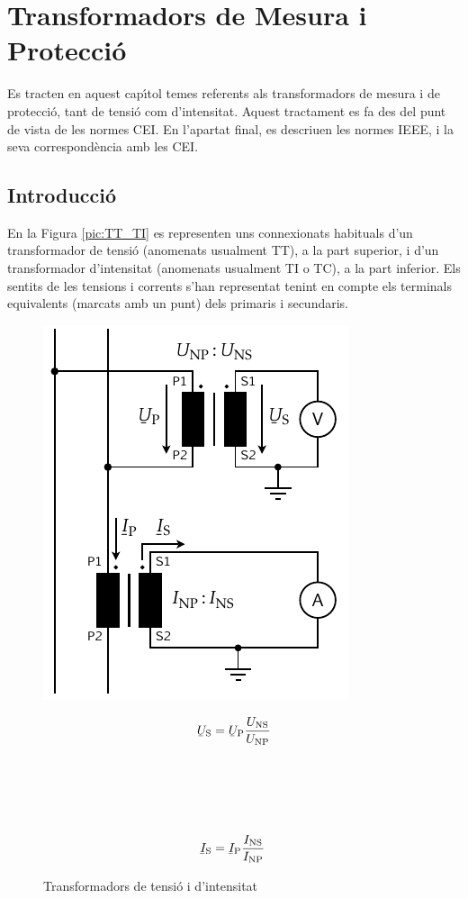 \chapter{Transformadors de Mesura i Protecci\'{o}}

Es tracten en aquest cap\'{\i}tol temes referents als transformadors de
mesura i de protecci\'{o}, tant de tensi\'{o} com d'intensitat. Aquest
tractament es fa des del punt de vista de les normes \textsf{CEI}.
En l'apartat final, es descriuen les normes \textsf{IEEE}, i la seva
correspond\`{e}ncia amb les \textsf{\textsf{CEI}}.

\section{Introducci\'{o}}

En la Figura \vref{pic:TT_TI} es representen uns connexionats
habituals d'un transformador de tensi\'{o} (anomenats usualment TT), a
la part superior, i d'un transformador d'intensitat (anomenats
usualment TI o TC), a la part inferior. Els sentits de les tensions
i corrents s'han representat tenint en compte els terminals
equivalents (marcats amb un punt) dels primaris i secundaris.

\begin{figure}[h!]
\hfill
\begin{minipage}[b]{85mm}
\hspace{1.5cm}
    \includegraphics{Imatges/Cap-TrafosMesProt-TI-TT.pdf}
\caption{Transformadors de tensi\'{o} i d'intensitat} \label{pic:TT_TI}
\end{minipage}
\hfill
\begin{minipage}[b][70mm][t]{50mm}
   \begin{align}
      \cmplx{U}\ped{S} &= \cmplx{U}\ped{P} \frac{U\ped{NS}}{U\ped{NP}}
      \\[24mm]
      \cmplx{I}\ped{S} &= \cmplx{I}\ped{P} \frac{I\ped{NS}}{I\ped{NP}}
   \end{align}
\end{minipage}
\end{figure}

